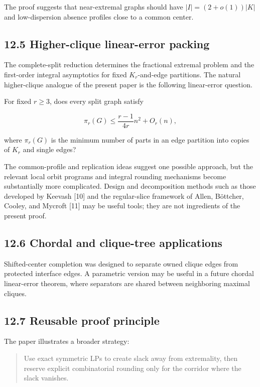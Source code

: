 \documentclass[11pt,a4paper]{article}
\begin{document}
The proof suggests that near-extremal graphs should have \(|I|=(2+o(1))|K|\) and low-dispersion absence profiles close to a common center.

\subsection{12.5 Higher-clique linear-error packing}\label{higher-clique-linear-error-packing}

The complete-split reduction determines the fractional extremal problem and the first-order integral asymptotics for fixed \(K_r\)-and-edge partitions. The natural higher-clique analogue of the present paper is the following linear-error question.

For fixed \(r\ge3\), does every split graph satisfy

\[
\pi_r(G)
\le
\frac{r-1}{4r}n^2+O_r(n),
\]

where \(\pi_r(G)\) is the minimum number of parts in an edge partition into copies of \(K_r\) and single edges?

The common-profile and replication ideas suggest one possible approach, but the relevant local orbit programs and integral rounding mechanisms become substantially more complicated. Design and decomposition methods such as those developed by Keevash {[}10{]} and the regular-slice framework of Allen, Böttcher, Cooley, and Mycroft {[}11{]} may be useful tools; they are not ingredients of the present proof.

\subsection{12.6 Chordal and clique-tree applications}\label{chordal-and-clique-tree-applications}

Shifted-center completion was designed to separate owned clique edges from protected interface edges. A parametric version may be useful in a future chordal linear-error theorem, where separators are shared between neighboring maximal cliques.

\subsection{12.7 Reusable proof principle}\label{reusable-proof-principle}

The paper illustrates a broader strategy:

\begin{quote}
Use exact symmetric LPs to create slack away from extremality, then reserve explicit combinatorial rounding only for the corridor where the slack vanishes.
\end{quote}
\end{document}
